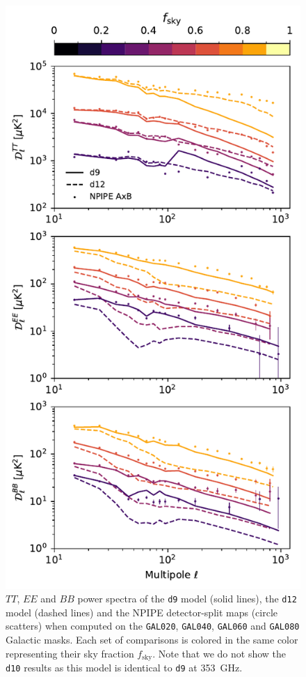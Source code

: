 \documentclass[twocolumn]{aastex631}
\begin{document}
\begin{figure}
    \centering
    \includegraphics[width=\columnwidth]{figures/largefield_power_all_TEB_pub.pdf}
    \caption{$TT$, $EE$ and $BB$ power spectra of the \texttt{d9} model (solid lines), the \texttt{d12} model (dashed lines) and the NPIPE detector-split maps (circle scatters) when computed on the \texttt{GAL020}, \texttt{GAL040}, \texttt{GAL060} and \texttt{GAL080} Galactic masks. Each set of comparisons is colored in the same color representing their sky fraction $f_{\mathrm{sky}}$. Note that we do not show the \texttt{d10} results as this model is identical to \texttt{d9} at 353~GHz.}
    \label{fig:largefield_power}
\end{figure}
\end{document}
